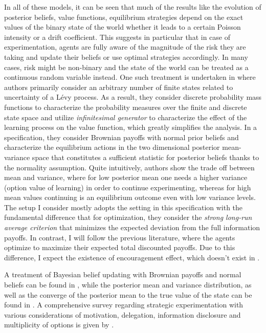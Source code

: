 In all of these models, it can be seen that much of the results like the evolution of posterior beliefs, value functions, equilibrium strategies depend on the exact values of the binary state of the world whether it leads to a certain Poisson intensity or a drift coefficient. This suggests in particular that in case of experimentation, agents are fully aware of the magnitude of the risk they are taking and update their beliefs or use optimal strategies accordingly. In many cases, risk might be non-binary and the state of the world can be treated as a continuous random variable instead. One such treatment is undertaken in \cite{keller2020undiscounted} where authors primarily consider an arbitrary number of finite states related to uncertainty of a Lévy process. As a result, they consider discrete probability mass functions to characterize the probability measures over the finite and discrete state space and utilize \textit{infinitesimal generator} to characterize the effect of the learning process on the value function, which greatly simplifies the analysis. In a specification, they consider Brownian payoffs with normal prior beliefs and characterize the equilibrium actions in the two dimensional posterior mean-variance space that constitutes a sufficient statistic for posterior beliefs thanks to the normality assumption. Quite intuitively, authors show the trade off between mean and variance, where for low posterior mean one needs a higher variance (option value of learning) in order to continue experimenting, whereas for high mean values continuing is an equilibrium outcome even with low variance levels. The setup I consider mostly adopts the setting in this specification with the fundamental difference that for optimization, they consider the \textit{strong long-run average criterion} that minimizes the expected deviation from the full information payoffs. In contrast, I will follow the previous literature, where the agents optimize to maximize their expected total discounted payoffs. Due to this difference, I expect the existence of encouragement effect, which doesn't exist in \cite{keller2020undiscounted}.

A treatment of Bayesian belief updating with Brownian payoffs and normal beliefs can be found in \cite{chernoff1968optimal}, while the posterior mean and variance distribution, as well as the converge of the posterior mean to the true value of the state can be found in \cite{keller2009brownian}. A comprehensive survey regarding strategic experimentation with various considerations of motivation, delegation, information disclosure and multiplicity of options is given by \cite{horner2017learning}.

